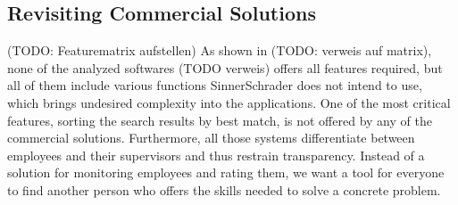 \subsection{Revisiting Commercial Solutions}
(TODO: Featurematrix aufstellen)
As shown in (TODO: verweis auf matrix), none of the analyzed softwares (TODO verweis) offers all features required, but all of them include various functions SinnerSchrader does not intend to use, which brings undesired complexity into the applications.
One of the most critical features, sorting the search results by best match, is not offered by any of the commercial solutions.
Furthermore, all those systems differentiate between employees and their supervisors and thus restrain transparency. Instead of a solution for monitoring employees and rating them, we want a tool for everyone to find another person who offers the skills needed to solve a concrete problem.



